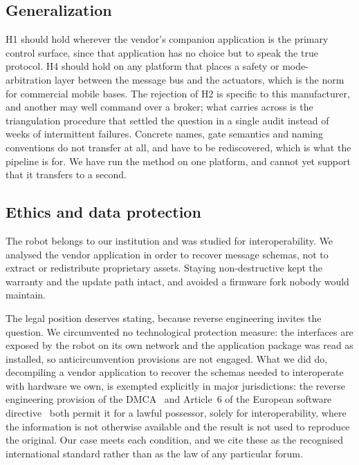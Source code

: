 \subsection{Generalization}

H1 should hold wherever the vendor's companion application is the primary control surface, since
that application has no choice but to speak the true protocol. H4 should hold on any platform
that places a safety or mode-arbitration layer between the message bus and the actuators, which
is the norm for commercial mobile bases. The rejection of H2 is specific to this manufacturer,
and another may well command over a broker; what carries across is the triangulation procedure
that settled the question in a single audit instead of weeks of intermittent failures. Concrete
names, gate semantics and naming conventions do not transfer at all, and have to be
rediscovered, which is what the pipeline is for. We have run the method on one platform, and
cannot yet support that it transfers to a second.

\subsection{Ethics and data protection}

The robot belongs to our institution and was studied for interoperability. We analysed the
vendor application in order to recover message schemas, not to extract or redistribute
proprietary assets. Staying non-destructive kept the warranty and the update path intact, and
avoided a firmware fork nobody would maintain.

The legal position deserves stating, because reverse engineering invites the question. We
circumvented no technological protection measure: the interfaces are exposed by the robot on its
own network and the application package was read as installed, so anticircumvention provisions
are not engaged. What we did do, decompiling a vendor application to recover the schemas needed
to interoperate with hardware we own, is exempted explicitly in major jurisdictions: the reverse
engineering provision of the DMCA~\cite{dmca1201f} and Article~6 of the European software
directive~\cite{eusoftwaredirective} both permit it for a lawful possessor, solely for
interoperability, where the information is not otherwise available and the result is not used to
reproduce the original. Our case meets each condition, and we cite these as the recognised
international standard rather than as the law of any particular forum.

